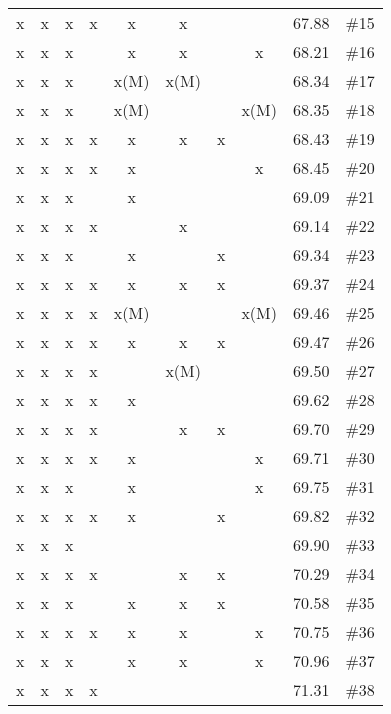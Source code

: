 \begin{longtable}{|c|c|c|c|c|c|c|c|c|c|}
 x    & x    & x    & x    & x    & x    &      &      & 67.88 & \#15 \\
 x    & x    & x    &      & x    & x    &      & x    & 68.21 & \#16 \\
 x    & x    & x    &      & x(M) & x(M) &      &      & 68.34 & \#17 \\
 x    & x    & x    &      & x(M) &      &      & x(M) & 68.35 & \#18 \\
 x    & x    & x    & x    & x    & x    & x    &      & 68.43 & \#19 \\
 x    & x    & x    & x    & x    &      &      & x    & 68.45 & \#20 \\
 x    & x    & x    &      & x    &      &      &      & 69.09 & \#21 \\
 x    & x    & x    & x    &      & x    &      &      & 69.14 & \#22 \\
 x    & x    & x    &      & x    &      & x    &      & 69.34 & \#23 \\
 x    & x    & x    & x    & x    & x    & x    &      & 69.37 & \#24 \\
 x    & x    & x    & x    & x(M) &      &      & x(M) & 69.46 & \#25 \\
 x    & x    & x    & x    & x    & x    & x    &      & 69.47 & \#26 \\
 x    & x    & x    & x    &      & x(M) &      &      & 69.50 & \#27 \\
 x    & x    & x    & x    & x    &      &      &      & 69.62 & \#28 \\
 x    & x    & x    & x    &      & x    & x    &      & 69.70 & \#29 \\
 x    & x    & x    & x    & x    &      &      & x    & 69.71 & \#30 \\
 x    & x    & x    &      & x    &      &      & x    & 69.75 & \#31 \\
 x    & x    & x    & x    & x    &      & x    &      & 69.82 & \#32 \\
 x    & x    & x    &      &      &      &      &      & 69.90 & \#33 \\
 x    & x    & x    & x    &      & x    & x    &      & 70.29 & \#34 \\
 x    & x    & x    &      & x    & x    & x    &      & 70.58 & \#35 \\
 x    & x    & x    & x    & x    & x    &      & x    & 70.75 & \#36 \\
 x    & x    & x    &      & x    & x    &      & x    & 70.96 & \#37 \\
 x    & x    & x    & x    &      &      &      &      & 71.31 & \#38 \\

\end{longtable}
